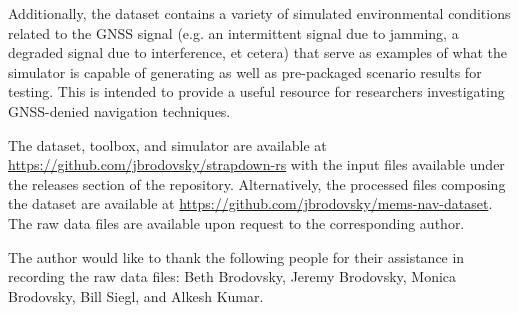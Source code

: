 \documentclass[Afour,sageh,times]{sagej}
\begin{document}
Additionally, the dataset contains a variety of simulated environmental conditions related to the GNSS signal (e.g. an intermittent signal due to jamming, a degraded signal due to interference, et cetera) that serve as examples of what the simulator is capable of generating as well as pre-packaged scenario results for testing. This is intended to provide a useful resource for researchers investigating GNSS-denied navigation techniques.

The dataset, toolbox, and simulator are available at \url{https://github.com/jbrodovsky/strapdown-rs} with the input files available under the releases section of the repository. Alternatively, the processed files composing the dataset are available at \url{https://github.com/jbrodovsky/mems-nav-dataset}. The raw data files are available upon request to the corresponding author.

\begin{acks}
The author would like to thank the following people for their assistance in recording the raw data files: Beth Brodovsky, Jeremy Brodovsky, Monica Brodovsky, Bill Siegl, and Alkesh Kumar.
\end{acks}




\end{document}
